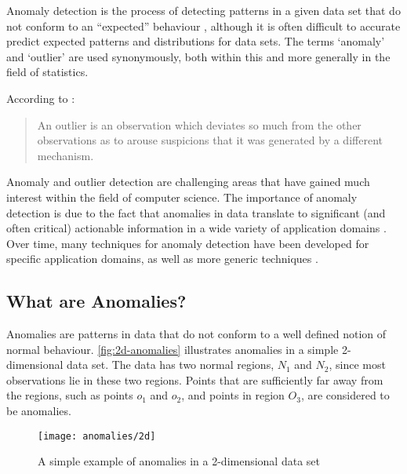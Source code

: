 Anomaly detection is the process of detecting patterns in a given data set that
do not conform to an ``expected'' behaviour \cite{Chandola:2007}, although it is
often difficult to accurate predict expected patterns and distributions for data
sets. The terms `anomaly' and `outlier' are used synonymously, both within this
\thesis{} and more generally in the field of statistics.

According to \citeauthor{Hawkins:1980} \cite{Hawkins:1980}:
\begin{quote}
    An outlier is an observation which deviates so much from the other
    observations as to arouse suspicions that it was generated by a different
    mechanism.
\end{quote}

Anomaly and outlier detection are challenging areas that have gained much
interest within the field of computer science. The importance of anomaly
detection is due to the fact that anomalies in data translate to significant
(and often critical) actionable information in a wide variety of application
domains \cite{Chandola:2007}. Over time, many techniques for anomaly detection
have been developed for specific application domains, as well as more generic
techniques \cite{Chandola:2007}.

\subsection{What are Anomalies?}
\label{anomalyDetection:whatAre}
Anomalies are patterns in data that do not conform to a well defined notion of
normal behaviour. \autoref{fig:2d-anomalies} illustrates anomalies in a simple
2-dimensional data set. The data has two normal regions, $N_1$ and $N_2$, since
most observations lie in these two regions. Points that are sufficiently far
away from the regions, such as points $o_1$ and $o_2$, and points in region
$O_3$, are considered to be anomalies.

\begin{figure}
    \centering
    \texttt{[image: anomalies/2d]}
    \caption[A simple example of anomalies in a 2-dimensional data set]{A
        simple example of anomalies in a 2-dimensional data set
        \cite{Chandola:2007}}
    \label{fig:2d-anomalies}
\end{figure}

